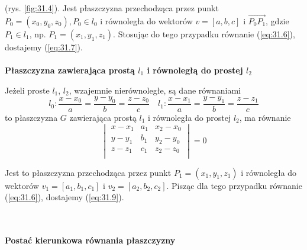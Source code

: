 \begin{dowod}
(rys. \ref{fig:31.4}). Jest płaszczyzna przechodząca przez punkt $P_0= (x_0, y_0, z_0), P_0 \in l_0$ i równoległa do wektorów $v=[a, b, c]$ i $\stackrel{\rightarrow}{P_0P_1}$, gdzie $P_1 \in l_1$, np. $P_1 = (x_1, y_1, z_1)$. Stosując do tego przypadku równanie (\ref{eq:31.6}), dostajemy (\ref{eq:31.7}). 
\\ \\
\textbf{Płaszczyzna zawierająca prostą $l_1$ i równoległą do prostej $l_2$}
\end{dowod}

\begin{pkt}{31.5}
Jeżeli proste $l_1$, $l_2$, wzajemnie nierównoległe, są dane równaniami
\begin{equation}
	l_0: \frac{x - x_0}{a} = \frac{y - y_0}{b} = \frac{z - z_0}{c} \quad l_1: \frac{x - x_1}{a} = \frac{y - y_1}{b} = \frac{z - z_1}{c}
\end{equation}
to płaszczyzna $G$ zawierająca prostą $l_1$ i równoległa do prostej $l_2$, ma równanie
\begin{equation}
	\begin{vmatrix}
		x - x_1 & a_1 & x_2 - x_0\\
		y - y_1 & b_1 & y_2 - y_0\\
		z - z_1 & c_1 & z_2 - z_0\\
	\end{vmatrix}
	= 0 
	\label{eq:31.9}
\end{equation}
\end{pkt}

\begin{dowod}
Jest to płaszczyzna przechodząca przez punkt $P_1 = (x_1, y_1, z_1)$ i równoległa do wektorów $v_1 = [a_1, b_1, c_1]$ i $v_2 = [a_2, b_2, c_2]$. Pisząc dla tego przypadku równanie (\ref{eq:31.6}), dostajemy (\ref{eq:31.9}).
\end{dowod}
\\ \\
\textbf{Postać kierunkowa równania płaszczyzny}

